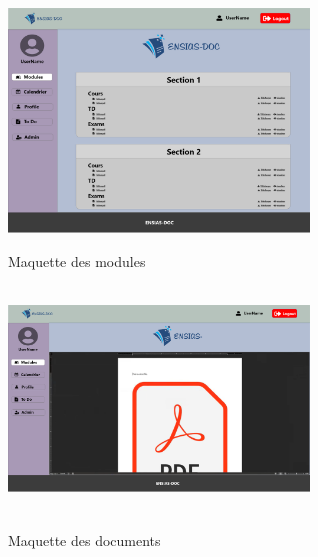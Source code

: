 \documentclass{article}
\begin{document}
{ \begin{minipage}[c]{.46\linewidth}
     \begin{center}
      \vspace{1cm}
             \includegraphics[width=8cm]{Module (1).png}
             \caption{Maquette des modules}
             \label{fig:Maquette des modules}
         \end{center}
   \end{minipage} \hfill
   \begin{minipage}[c]{.46\linewidth}
    \begin{center}
    \vspace{1cm}
            \includegraphics[width=8cm,height=6cm]{Document.png}
            \caption{Maquette des documents}
            \label{Maquette des documents}
        \end{center}
 \end{minipage}
 
}
\end{document}
